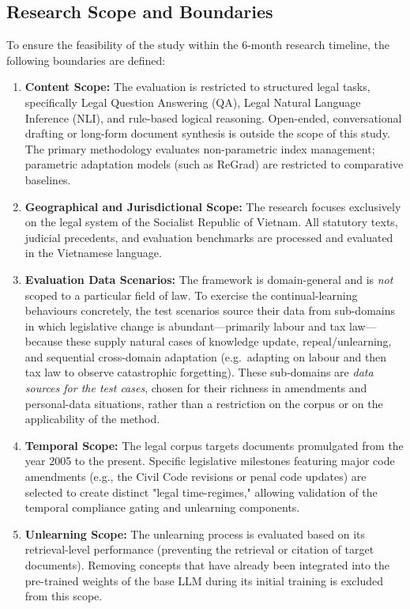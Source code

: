 \subsection{Research Scope and Boundaries}
To ensure the feasibility of the study within the 6-month research timeline, the following boundaries are defined:
\begin{enumerate}
    \item \textbf{Content Scope:} The evaluation is restricted to structured legal tasks, specifically Legal Question Answering (QA), Legal Natural Language Inference (NLI), and rule-based logical reasoning. Open-ended, conversational drafting or long-form document synthesis is outside the scope of this study. The primary methodology evaluates non-parametric index management; parametric adaptation models (such as ReGrad) are restricted to comparative baselines.
    \item \textbf{Geographical and Jurisdictional Scope:} The research focuses exclusively on the legal system of the Socialist Republic of Vietnam. All statutory texts, judicial precedents, and evaluation benchmarks are processed and evaluated in the Vietnamese language.
    \item \textbf{Evaluation Data Scenarios:} The framework is domain-general and is \emph{not} scoped to a particular field of law. To exercise the continual-learning behaviours concretely, the test scenarios source their data from sub-domains in which legislative change is abundant---primarily labour and tax law---because these supply natural cases of knowledge update, repeal/unlearning, and sequential cross-domain adaptation (e.g.\ adapting on labour and then tax law to observe catastrophic forgetting). These sub-domains are \emph{data sources for the test cases}, chosen for their richness in amendments and personal-data situations, rather than a restriction on the corpus or on the applicability of the method.
    \item \textbf{Temporal Scope:} The legal corpus targets documents promulgated from the year 2005 to the present. Specific legislative milestones featuring major code amendments (e.g., the Civil Code revisions or penal code updates) are selected to create distinct "legal time-regimes," allowing validation of the temporal compliance gating and unlearning components.
    \item \textbf{Unlearning Scope:} The unlearning process is evaluated based on its retrieval-level performance (preventing the retrieval or citation of target documents). Removing concepts that have already been integrated into the pre-trained weights of the base LLM during its initial training is excluded from this scope.
\end{enumerate}
